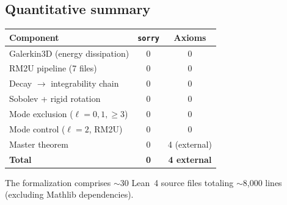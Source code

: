 \documentclass[12pt, reqno]{amsart}
\theoremstyle{definition}
\theoremstyle{remark}
\numberwithin{equation}{section}
\begin{document}
\subsection{Quantitative summary}

\begin{center}
\begin{tabular}{lcc}
\hline
\textbf{Component} & \textbf{\texttt{sorry}} & \textbf{Axioms} \\
\hline
Galerkin3D (energy dissipation) & 0 & 0 \\
RM2U pipeline (7 files) & 0 & 0 \\
Decay $\to$ integrability chain & 0 & 0 \\
Sobolev + rigid rotation & 0 & 0 \\
Mode exclusion ($\ell=0,1,\ge 3$) & 0 & 0 \\
Mode control ($\ell=2$, RM2U) & 0 & 0 \\
Master theorem & 0 & 4 (external) \\
\hline
\textbf{Total} & \textbf{0} & \textbf{4 external} \\
\hline
\end{tabular}
\end{center}

\noindent
The formalization comprises $\sim$30 Lean~4 source files totaling
$\sim$8{,}000 lines (excluding Mathlib dependencies).

\end{document}
